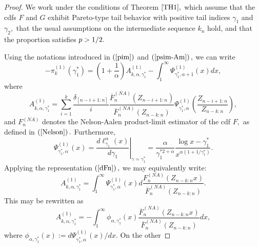 \documentclass[reqno,openbib,runningheads,a4paper,12pt]{amsart}%
\begin{document}
\begin{proof}
We work under the conditions of Theorem $\ref{TH1},$ which assume that the
cdfs $F$ and $G$ exhibit Pareto-type tail behavior with positive tail indices
$\gamma_{1}$ and $\gamma_{2},$ that the usual assumptions on the intermediate
sequence $k_{n}$ hold, and that the proportion satisfies $p>1/2.\smallskip$

Using the notations introduced in $\left(  \ref{pim}\right)  $ and $\left(
\ref{psim-Am}\right)  ,$ we can write
\begin{equation}
-\pi_{k}^{\left(  1\right)  }\left(  \gamma_{1}^{\ast}\right)  =\left(
1+\dfrac{1}{\alpha}\right)  A_{k,\alpha,\gamma_{1}^{\ast}}^{\left(  1\right)
}-\int_{1}^{\infty}\Psi_{\gamma_{1}^{\ast},\alpha+1}^{\left(  1\right)
}\left(  x\right)  dx,\label{f1}%
\end{equation}
where
\[
A_{k,\alpha,\gamma_{1}^{\ast}}^{\left(  1\right)  }=\sum_{i=1}^{k}\frac
{\delta_{\left[  n-i+1:n\right]  }}{i}\dfrac{\overline{F}_{n}^{\left(
NA\right)  }\left(  Z_{n-i+1:n}\right)  }{\overline{F}_{n}^{\left(  NA\right)
}\left(  Z_{n-k:n}\right)  }\Psi_{\gamma_{1}^{\ast},\alpha}^{\left(  1\right)
}\left(  \frac{Z_{n-i+1:n}}{Z_{n-k:n}}\right)  ,
\]
and $F_{n}^{\left(  NA\right)  }$ denotes the Nelson-Aalen product-limit
estimator of the cdf $F,$ as defined in $\left(  \ref{Nelson}\right)  .$
Furthermore,
\[
\Psi_{\gamma_{1}^{\ast},\alpha}^{\left(  1\right)  }\left(  x\right)  =\left.
\frac{d\ell_{\gamma_{1}}^{\alpha}\left(  x\right)  }{d\gamma_{1}}\right\vert
_{\gamma=\gamma_{1}^{\ast}}=\frac{\alpha}{\gamma_{1}^{\ast2+\alpha}}\frac{\log
x-\gamma_{1}^{\ast}}{x^{\alpha\left(  1+1/\gamma_{1}^{\ast}\right)  }}.
\]
Applying the representation $\left(  \ref{dFn}\right)  ,$ we may equivalently
write:
\[
A_{k,\alpha,\gamma_{1}^{\ast}}^{\left(  1\right)  }=\int_{1}^{\infty}%
\Psi_{\gamma_{1}^{\ast},\alpha}^{\left(  1\right)  }\left(  x\right)
d\frac{F_{n}^{\left(  NA\right)  }\left(  Z_{n-k:n}x\right)  }{\overline
{F}_{n}^{\left(  NA\right)  }\left(  Z_{n-k:n}\right)  }.
\]
This may be rewritten as%
\begin{equation}
A_{k,\alpha,\gamma_{1}^{\ast}}^{\left(  1\right)  }=-\int_{1}^{\infty}%
\phi_{\alpha,\gamma_{1}^{\ast}}\left(  x\right)  \frac{\overline{F}%
_{n}^{\left(  NA\right)  }\left(  Z_{n-k:n}x\right)  }{\overline{F}%
_{n}^{\left(  NA\right)  }\left(  Z_{n-k:n}\right)  }dx,\label{f2}%
\end{equation}
where $\phi_{\alpha,\gamma_{1}^{\ast}}\left(  x\right)  :=d\Psi_{\gamma
_{1}^{\ast},\alpha}^{\left(  1\right)  }\left(  x\right)  /dx.$ On the other

\end{proof}
\end{document}
